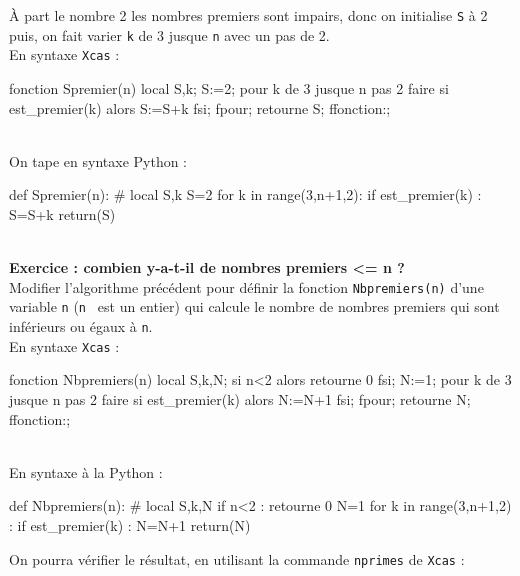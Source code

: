 \documentclass[12pt,a4paper]{book}
\begin{document}
\begin{giacjshere}
\`A part le nombre 2 les nombres premiers sont impairs, donc on initialise 
{\tt S} \`a  2 puis, on fait varier {\tt k} de 3 jusque {\tt n} avec 
un pas de 2.\\
En syntaxe {\tt Xcas} :
\begin{giaconload}
fonction Spremier(n) 
 local S,k;
 S:=2; 
 pour k de 3 jusque n pas 2 faire 
   si est_premier(k) alors S:=S+k fsi; 
 fpour;
 retourne S; 
ffonction:;
\end{giaconload}
\\
On tape en syntaxe Python :
\begin{giacprog}
def Spremier(n):
    # local S,k
    S=2
    for k in range(3,n+1,2):
        if est_premier(k) :
            S=S+k 
    return(S)
\end{giacprog}
\\
{\bf Exercice : combien y-a-t-il de nombres premiers <= n ?}\\
Modifier l'algorithme pr\'ec\'edent pour d\'efinir la fonction 
{\tt Nbpremiers(n)} d'une variable {\tt n} ({\tt n } est un  entier) qui 
calcule le nombre de nombres premiers qui sont inf\'erieurs
 ou \'egaux \`a {\tt n}.\\
En syntaxe {\tt Xcas} :
\begin{giaconload}
fonction Nbpremiers(n) 
 local S,k,N;
 si n<2 alors retourne 0 fsi;
 N:=1; 
 pour k de 3 jusque n pas 2 faire 
   si est_premier(k) alors N:=N+1 fsi; 
 fpour;
 retourne N; 
ffonction:;
\end{giaconload}
\\
En syntaxe \`a la Python :
\begin{giacprog}
def Nbpremiers(n):
    # local S,k,N
    if n<2 :
        retourne 0
    N=1
    for k in range(3,n+1,2) :
        if est_premier(k) :
            N=N+1 
    return(N)
\end{giacprog}
On  pourra v\'erifier le r\'esultat, en utilisant la commande  {\tt nprimes} de
 {\tt Xcas} :\\


\end{giacjshere}
\end{document}
